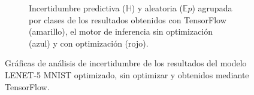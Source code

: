 \begin{figure}[h]
\begin{subfigure}[b]{0.51\textwidth}
         \caption{Incertidumbre predictiva ($\mathbb{H}$) y aleatoria ($\mathbb{E}p$) agrupada por clases de los resultados obtenidos con TensorFlow (amarillo), el motor de inferencia sin optimización (azul) y con optimización (rojo).}
         \label{fig:bad_uncert_class}
     \end{subfigure}
     \caption{Gráficas de análisis de incertidumbre de los resultados del modelo LENET-5 MNIST optimizado, sin optimizar y obtenidos mediante TensorFlow.}
     \label{fig:bad_uncert}
\end{figure}
